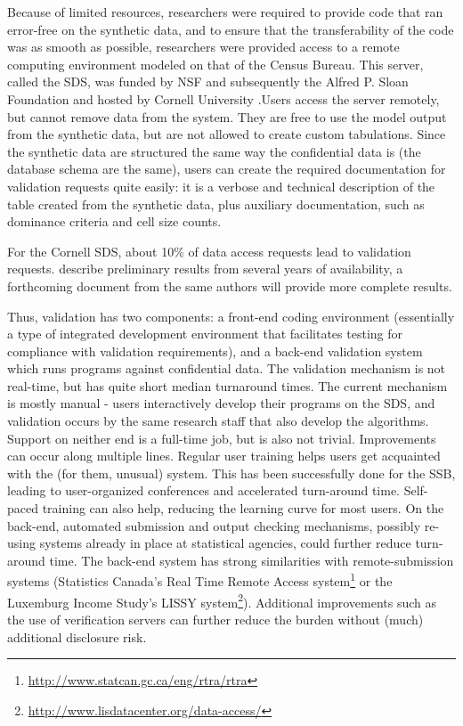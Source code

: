 \documentclass[letterpaper,12pt]{article}
\begin{document}
Because of limited resources, researchers were required to provide code that ran error-free on the synthetic data, and to ensure that the transferability of the code was as smooth as possible, researchers were provided access to a remote computing environment modeled on that of the Census Bureau. This server, called the \acf{SDS}, was funded by \ac{NSF} and subsequently the Alfred P. Sloan Foundation and hosted by Cornell University \citep{AbowdVilhuber::SOLE::2016}.Users access the server remotely, but cannot remove data from the system. They are free to use the model output from the synthetic data, but are not allowed to create custom tabulations. Since the synthetic data are structured the same way the confidential data is (the database schema are the same), users can create the required documentation for validation requests quite easily: it is a verbose and technical description of the table created from the synthetic data, plus auxiliary documentation, such as dominance criteria and cell size counts. 

For the Cornell \ac{SDS}, about 10\% of data access requests lead to validation requests.  \citet{AbowdVilhuber::SOLE::2016} describe preliminary results from several years of availability, a forthcoming document from the same authors will provide more complete results.

Thus, validation has two components: a front-end coding environment (essentially a type of integrated development environment that facilitates testing for compliance with validation requirements), and a back-end validation system which runs programs against confidential data. The validation mechanism is not real-time, but has quite short median turnaround times. The current mechanism is mostly manual - users interactively develop their programs on the \ac{SDS}, and validation occurs by the same research staff that also develop the algorithms. Support on neither end is a full-time job, but is also not trivial. Improvements can occur along multiple lines. Regular user training helps users get acquainted with the (for them, unusual) system. This has been successfully done for the \ac{SSB}, leading to user-organized conferences \citep{carr:assa:2016,rutledge:assa:2016,sheppard:assa:2016,wickslim:assa:2016} and accelerated turn-around time. Self-paced training can also help, reducing the learning curve for most users. On the back-end, automated submission and output checking mechanisms, possibly re-using systems already in place at statistical agencies, could further reduce turn-around time. The back-end system has strong similarities with remote-submission systems (Statistics Canada's Real Time Remote Access system\footnote{\url{http://www.statcan.gc.ca/eng/rtra/rtra}} or the Luxemburg Income Study's LISSY system\footnote{\url{http://www.lisdatacenter.org/data-access/}}). Additional improvements such as the use of verification servers \citep{Barrientos2017} can further reduce the burden without (much) additional disclosure risk. 
\end{document}
